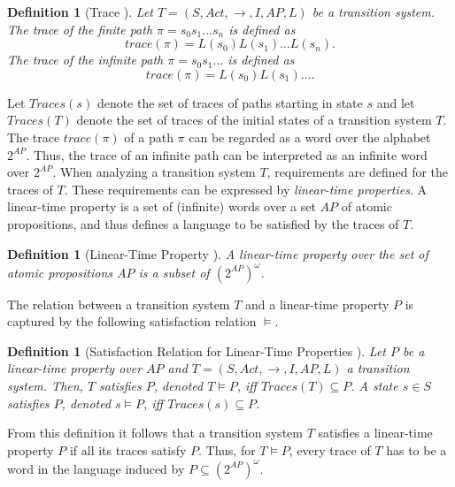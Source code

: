 \documentclass[a4paper, 12pt, twoside]{report}
\theoremstyle{plain}
\newtheorem{definition}[theorem]{Definition}
\begin{document}
	\begin{definition}[Trace \cite{baier2008principles}]\label{def:trace}
		Let $T=(S, Act, \rightarrow, I, AP, L)$ be a transition system.  The \textup{trace} of the finite path $\pi=s_0 s_1 \dots s_n$ is defined as \[trace(\pi)=L(s_0)L(s_1)\dots L(s_n).\] The \textup{trace} of the infinite path $\pi=s_0 s_1 \dots$ is defined as \[trace(\pi)=L(s_0)L(s_1)\dots.\]
	\end{definition}

	Let $Traces(s)$ denote the set of traces of paths starting in state $s$ and let $Traces(T)$ denote the set of traces of the initial states of a transition system $T$.\\

	The trace $trace(\pi)$ of a path $\pi$ can be regarded as a word over the alphabet $2^{AP}$. Thus, the trace of an infinite path can be interpreted as an infinite word over $2^{AP}$. When analyzing a transition system $T$, requirements are defined for the traces of $T$. These requirements can be expressed by \textit{linear-time properties}. A linear-time property is a set of (infinite) words over a set $AP$ of atomic propositions, and thus defines a language to be satisfied by the traces of $T$.
	
	\begin{definition}[Linear-Time Property \cite{baier2008principles}]\label{def:lt_property}
		A \textup{linear-time property} over the set of atomic propositions $AP$ is a subset of $(2^{AP})^{\omega}$.
	\end{definition}

	The relation between a transition system $T$ and a linear-time property $P$ is captured by the following satisfaction relation $\models$.
	
	\begin{definition}[Satisfaction Relation for Linear-Time Properties \cite{baier2008principles}]\label{def:satis_lt_property}
		Let $P$ be a linear-time property over $AP$ and $T=(S, Act, \rightarrow, I, AP, L)$ a transition system. Then, $T$ \textup{satisfies} $P$, denoted $T \models P$, iff $Traces(T) \subseteq P$. A state $s \in S$ satisfies $P$, denoted $s \models P$, iff $Traces(s) \subseteq P$.
	\end{definition}

	From this definition it follows that a transition system $T$ satisfies a linear-time property $P$ if all its traces satisfy $P$. Thus, for $T \models P$, every trace of $T$ has to be a word in the language induced by $P \subseteq (2^{AP})^{\omega}$.
\end{document}

